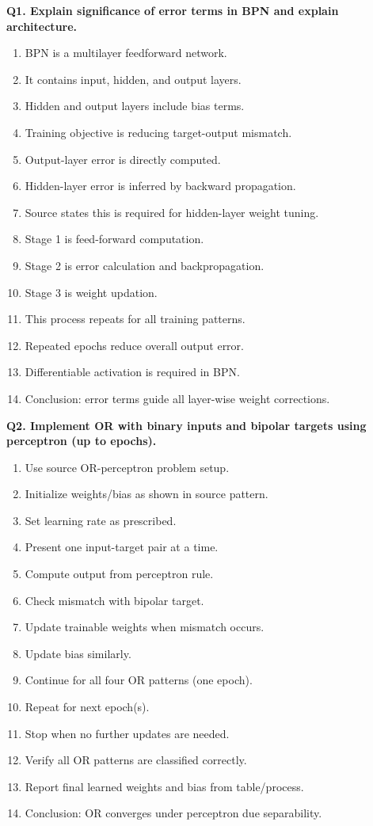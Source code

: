 \documentclass[11pt,a4paper]{article}
\begin{document}
\textbf{Q1. Explain significance of error terms in BPN and explain architecture.}
\begin{enumerate}
\item BPN is a multilayer feedforward network.
\item It contains input, hidden, and output layers.
\item Hidden and output layers include bias terms.
\item Training objective is reducing target-output mismatch.
\item Output-layer error is directly computed.
\item Hidden-layer error is inferred by backward propagation.
\item Source states this is required for hidden-layer weight tuning.
\item Stage 1 is feed-forward computation.
\item Stage 2 is error calculation and backpropagation.
\item Stage 3 is weight updation.
\item This process repeats for all training patterns.
\item Repeated epochs reduce overall output error.
\item Differentiable activation is required in BPN.
\item Conclusion: error terms guide all layer-wise weight corrections.
\end{enumerate}

\textbf{Q2. Implement OR with binary inputs and bipolar targets using perceptron (up to epochs).}
\begin{enumerate}
\item Use source OR-perceptron problem setup.
\item Initialize weights/bias as shown in source pattern.
\item Set learning rate as prescribed.
\item Present one input-target pair at a time.
\item Compute output from perceptron rule.
\item Check mismatch with bipolar target.
\item Update trainable weights when mismatch occurs.
\item Update bias similarly.
\item Continue for all four OR patterns (one epoch).
\item Repeat for next epoch(s).
\item Stop when no further updates are needed.
\item Verify all OR patterns are classified correctly.
\item Report final learned weights and bias from table/process.
\item Conclusion: OR converges under perceptron due separability.
\end{enumerate}
\end{document}
